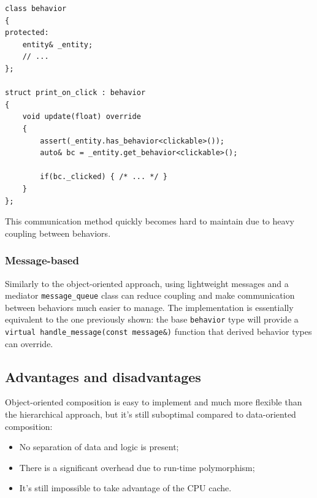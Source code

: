 \documentclass[oneside, 12pt, a4paper, openany]{book}
\begin{document}
\begin{verbatim}
class behavior
{
protected:
    entity& _entity;
    // ...
};

struct print_on_click : behavior
{
    void update(float) override
    {
        assert(_entity.has_behavior<clickable>());
        auto& bc = _entity.get_behavior<clickable>();

        if(bc._clicked) { /* ... */ }
    }
};
\end{verbatim}

This communication method quickly becomes hard to maintain due to heavy
coupling between behaviors.

\subsubsection{Message-based}\label{message-based-1}

Similarly to the object-oriented approach, using lightweight messages
and a mediator
\texttt{message_queue}
class can reduce coupling and make communication between behaviors much
easier to manage. The implementation is essentially equivalent to the
one previously shown: the base
\texttt{behavior}
type will provide a
\texttt{virtual handle_message(const message&)}
function that derived behavior types can override.

\subsection{Advantages and
disadvantages}\label{advantages-and-disadvantages-1}

Object-oriented composition is easy to implement and much more flexible
than the hierarchical approach, but it's still suboptimal compared to
data-oriented composition:

\begin{itemize}
\item
  No separation of data and logic is present;
\item
  There is a significant overhead due to run-time polymorphism;
\item
  It's still impossible to take advantage of the CPU cache.
\end{itemize}
\end{document}
